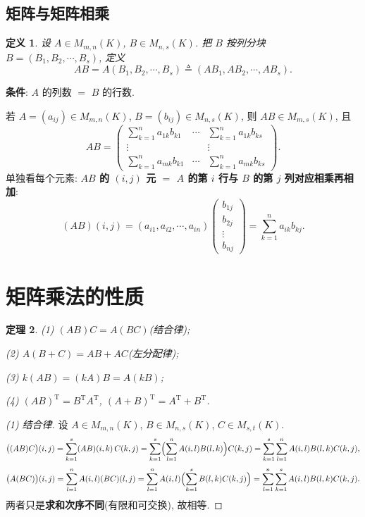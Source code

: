 \documentclass[UTF8,11pt]{ctexart}
\theoremstyle{cnthm}
\newtheorem{thm}{定理}[section]
\newtheorem{defn}[thm]{定义}
\begin{document}
\subsection{矩阵与矩阵相乘}

\begin{defn}
设 $A\in M_{m,n}(K)$, $B\in M_{n,s}(K)$. 把 $B$ 按列分块 $B=(B_1,B_2,\cdots,B_s)$, 定义
\[
AB=A(B_1,B_2,\cdots,B_s)\triangleq(AB_1,AB_2,\cdots,AB_s).
\]
\end{defn}

\textbf{条件}: $A$ 的列数 $=$ $B$ 的行数.

若 $A=(a_{ij})\in M_{m,n}(K)$, $B=(b_{ij})\in M_{n,s}(K)$, 则 $AB\in M_{m,s}(K)$, 且
\[
AB=
\begin{pmatrix}
\sum\limits_{k=1}^{n}a_{1k}b_{k1}&\cdots&\sum\limits_{k=1}^{n}a_{1k}b_{ks}\\
\vdots&&\vdots\\
\sum\limits_{k=1}^{n}a_{mk}b_{k1}&\cdots&\sum\limits_{k=1}^{n}a_{mk}b_{ks}
\end{pmatrix}.
\]
单独看每个元素: \textbf{$AB$ 的 $(i,j)$ 元 $=$ $A$ 的第 $i$ 行与 $B$ 的第 $j$ 列对应相乘再相加}:
\[
(AB)(i,j)=(a_{i1},a_{i2},\cdots,a_{in})
\begin{pmatrix}b_{1j}\\b_{2j}\\\vdots\\b_{nj}\end{pmatrix}
=\sum_{k=1}^{n}a_{ik}b_{kj}.
\]

\section{矩阵乘法的性质}

\begin{thm}
(1) $(AB)C=A(BC)$(结合律);

(2) $A(B+C)=AB+AC$(左分配律);

(3) $k(AB)=(kA)B=A(kB)$;

(4) $(AB)^{\mathrm T}=B^{\mathrm T}A^{\mathrm T}$, $(A+B)^{\mathrm T}=A^{\mathrm T}+B^{\mathrm T}$.
\end{thm}

\begin{proof}[(1) 结合律]
设 $A\in M_{m,n}(K)$, $B\in M_{n,s}(K)$, $C\in M_{s,t}(K)$.
\[
\bigl((AB)C\bigr)(i,j)=\sum_{k=1}^{s}(AB)(i,k)\,C(k,j)
=\sum_{k=1}^{s}\Bigl(\sum_{l=1}^{n}A(i,l)B(l,k)\Bigr)C(k,j)
=\sum_{k=1}^{s}\sum_{l=1}^{n}A(i,l)B(l,k)C(k,j),
\]
\[
\bigl(A(BC)\bigr)(i,j)=\sum_{l=1}^{n}A(i,l)(BC)(l,j)
=\sum_{l=1}^{n}A(i,l)\Bigl(\sum_{k=1}^{s}B(l,k)C(k,j)\Bigr)
=\sum_{l=1}^{n}\sum_{k=1}^{s}A(i,l)B(l,k)C(k,j).
\]
两者只是\textbf{求和次序不同}(有限和可交换), 故相等.
\end{proof}
\end{document}
